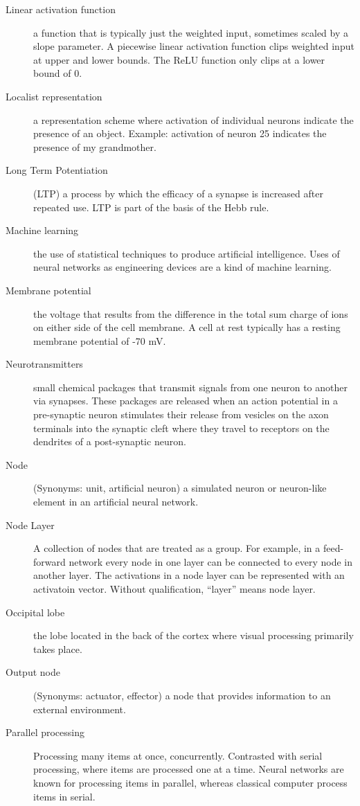 \begin{description}
\item[Linear activation function] a function that is typically just the weighted input, sometimes scaled by a slope parameter. A piecewise linear activation function clips weighted input at  upper and lower bounds. The ReLU function only clips at a lower bound of 0.
\item[Localist representation] a representation scheme where activation of individual neurons indicate the presence of an object. Example: activation of neuron 25 indicates the presence of my grandmother.
\item[Long Term Potentiation] (LTP) a process by which the efficacy of a synapse is increased after repeated use. LTP is part of the basis of the Hebb rule.
\item[Machine learning] the use of statistical techniques to produce artificial intelligence. Uses of neural networks as engineering devices are a kind of machine learning.
\item[Membrane potential] the voltage that results from the difference in the total sum charge of ions on either side of the cell membrane. A cell at rest typically has a resting membrane potential of -70 mV. 
\item[Neurotransmitters] small chemical packages that transmit signals from one neuron to another via synapses. These packages are released when an action potential in a pre-synaptic neuron stimulates their release from vesicles on the axon terminals into the synaptic cleft where they travel to receptors on the dendrites of a post-synaptic neuron. 
\item[Node] (Synonyms: unit, artificial neuron) a simulated neuron or neuron-like element in an artificial neural network. 
\item[Node Layer] A collection of nodes that are treated as a group. For example, in a feed-forward network every node in one layer can be connected to every node in another layer. The activations in a node layer can be represented with an activatoin vector. Without qualification, ``layer'' means node layer.
\item[Occipital lobe] the lobe located in the back of the cortex where visual processing primarily takes place. 
\item[Output node] (Synonyms: actuator, effector) a node that provides information to an external environment. 
\item[Parallel processing] Processing many items at once, concurrently. Contrasted with serial processing, where items are processed one at a time.  Neural networks are known for processing items in parallel, whereas classical computer process items in serial.

\end{description}
